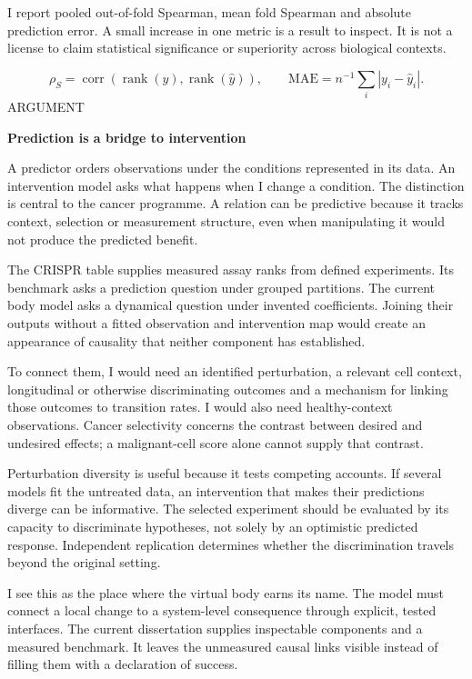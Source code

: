 \documentclass[10pt]{article}
\begin{document}
I report pooled out-of-fold Spearman, mean fold Spearman and absolute prediction error. A small increase in one metric is a result to inspect. It is not a license to claim statistical significance or superiority across biological contexts.\par
\[\rho_S=\operatorname{corr}(\operatorname{rank}(y),\operatorname{rank}(\widehat y)),\qquad\mathrm{MAE}=n^{-1}\sum_i|y_i-\widehat y_i|.\]
\clearpage
\hypertarget{p13}{}
{\small\color{accent}\MakeUppercase{Argument}}\par
{\LARGE\bfseries\color{ink}Prediction is a bridge to intervention}\par\vspace{5pt}
A predictor orders observations under the conditions represented in its data. An intervention model asks what happens when I change a condition. The distinction is central to the cancer programme. A relation can be predictive because it tracks context, selection or measurement structure, even when manipulating it would not produce the predicted benefit.\par
The CRISPR table supplies measured assay ranks from defined experiments. Its benchmark asks a prediction question under grouped partitions. The current body model asks a dynamical question under invented coefficients. Joining their outputs without a fitted observation and intervention map would create an appearance of causality that neither component has established.\par
To connect them, I would need an identified perturbation, a relevant cell context, longitudinal or otherwise discriminating outcomes and a mechanism for linking those outcomes to transition rates. I would also need healthy-context observations. Cancer selectivity concerns the contrast between desired and undesired effects; a malignant-cell score alone cannot supply that contrast.\par
Perturbation diversity is useful because it tests competing accounts. If several models fit the untreated data, an intervention that makes their predictions diverge can be informative. The selected experiment should be evaluated by its capacity to discriminate hypotheses, not solely by an optimistic predicted response. Independent replication determines whether the discrimination travels beyond the original setting.\par
I see this as the place where the virtual body earns its name. The model must connect a local change to a system-level consequence through explicit, tested interfaces. The current dissertation supplies inspectable components and a measured benchmark. It leaves the unmeasured causal links visible instead of filling them with a declaration of success.\par
\end{document}
